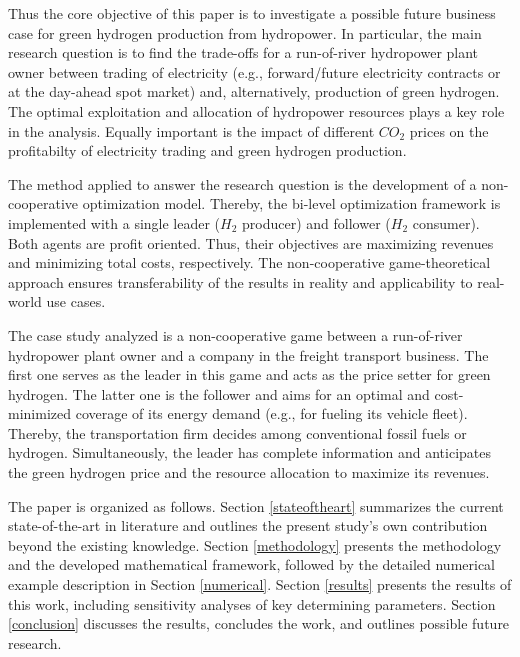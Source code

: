 \documentclass[review]{elsarticle}
\begin{document}
Thus the core objective of this paper is to investigate a possible future business case for green hydrogen production from hydropower. In particular, the main research question is to find the trade-offs for a run-of-river hydropower plant owner between trading of electricity (e.g., forward/future electricity contracts or at the day-ahead spot market) and, alternatively, production of green hydrogen. The optimal exploitation and allocation of hydropower resources plays a key role in the analysis. Equally important is the impact of different $CO_2$ prices on the profitabilty of electricity trading and green hydrogen production.\vspace{0.3cm} 

The method applied to answer the research question is the development of a non-cooperative optimization model. Thereby, the bi-level optimization framework is implemented with a single leader ($H_2$ producer) and follower ($H_2$ consumer). Both agents are profit oriented. Thus, their objectives are maximizing revenues and minimizing total costs, respectively. The non-cooperative game-theoretical approach ensures transferability of the results in reality and applicability to real-world use cases.\vspace{0.3cm} 

The case study analyzed is a non-cooperative game between a run-of-river hydropower plant owner and a company in the freight transport business. The first one serves as the leader in this game and acts as the price setter for green hydrogen. The latter one is the follower and aims for an optimal and cost-minimized coverage of its energy demand (e.g., for fueling its vehicle fleet). Thereby, the transportation firm decides among conventional fossil fuels or hydrogen. Simultaneously, the leader has complete information and anticipates the green hydrogen price and the resource allocation to maximize its revenues.\vspace{0.3cm} 

The paper is organized as follows. Section \ref{stateoftheart} summarizes the current state-of-the-art in literature and outlines the present study's own contribution beyond the existing knowledge. Section \ref{methodology} presents the methodology and the developed mathematical framework, followed by the detailed numerical example description in Section \ref{numerical}. Section \ref{results} presents the results of this work, including sensitivity analyses of key determining parameters. Section \ref{conclusion} discusses the results, concludes the work, and outlines possible future research.
\end{document}
